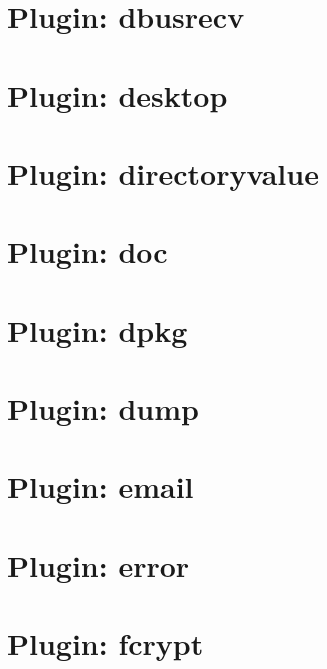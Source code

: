 \let\mypdfximage\pdfximage\def\pdfximage{\immediate\mypdfximage}\documentclass[twoside]{book}
\newcommand{\+}{\discretionary{\mbox{\scriptsize$\hookleftarrow$}}{}{}}
\begin{document}
\chapter{Plugin\+: dbusrecv}
\label{md_src_plugins_dbusrecv_README}

\chapter{Plugin\+: desktop}
\label{md_src_plugins_desktop_README}

\chapter{Plugin\+: directoryvalue}
\label{md_src_plugins_directoryvalue_README}

\chapter{Plugin\+: doc}
\label{md_src_plugins_doc_README}

\chapter{Plugin\+: dpkg}
\label{md_src_plugins_dpkg_README}

\chapter{Plugin\+: dump}
\label{md_src_plugins_dump_README}

\chapter{Plugin\+: email}
\label{md_src_plugins_email_README}

\chapter{Plugin\+: error}
\label{md_src_plugins_error_README}

\chapter{Plugin\+: fcrypt}
\label{md_src_plugins_fcrypt_README}

\end{document}
